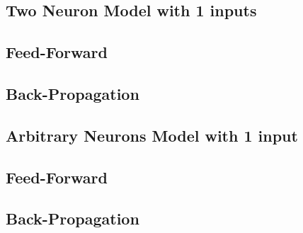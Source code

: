 \documentclass{article}
\begin{document}
\subsection{Two Neuron Model with 1 inputs}

\subsection{Feed-Forward}

\subsection{Back-Propagation}

\subsection{Arbitrary Neurons Model with 1 input}

\subsection{Feed-Forward}

\subsection{Back-Propagation}
\end{document}
